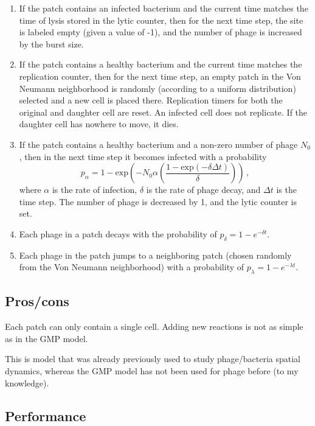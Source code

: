 \documentclass{article}
\begin{document}
\begin{enumerate}
    \item If the patch contains an infected bacterium and the current time matches the time of lysis stored in the lytic counter, then for the next time step, the site is labeled empty (given a value of -1), and the number of phage is increased by the burst size.
    \item If the patch contains a healthy bacterium and the current time matches the replication counter, then for the next time step, an empty patch in the Von Neumann neighborhood is randomly (according to a uniform distribution) selected and a new cell is placed there. Replication timers for both the original and daughter cell are reset. An infected cell does not replicate. If the daughter cell has nowhere to move, it dies.
    \item If the patch contains a healthy bacterium and a non-zero number of phage $N_0$, then in the next time step it becomes infected with a probability
    \begin{equation}
        p_\alpha = 1 - \text{exp}\left(-N_0\alpha\left(\frac{1-\text{exp}(-\delta\Delta{t})}{\delta}\right)\right)\,,
    \end{equation}
    where $\alpha$ is the rate of infection, $\delta$ is the rate of phage decay, and $\Delta{t}$ is the time step. The number of phage is decreased by 1, and the lytic counter is set.
    \item Each phage in a patch decays with the probability of $p_\delta = 1 - e^{-\delta{t}}$.
    \item Each phage in the patch jumps to a neighboring patch (chosen randomly from the Von Neumann neighborhood) with a probability of $p_\lambda = 1 - e^{-\lambda{t}}$.
\end{enumerate}

\subsection{Pros/cons}
Each patch can only contain a single cell. Adding new reactions is not as simple as in the GMP model.

This is model that was already previously used to study phage/bacteria spatial dynamics, whereas the GMP model has not been used for phage before (to my knowledge).

\subsection{Performance}
\end{document}
